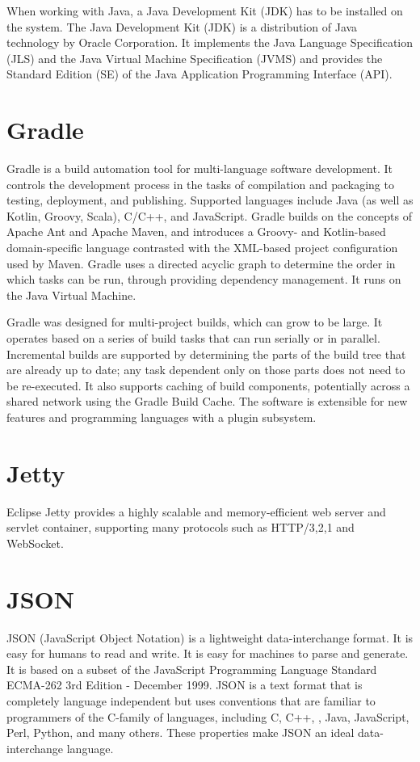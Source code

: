 	When working with Java, a Java Development Kit (JDK) has to be installed on the system.
	The Java Development Kit (JDK) is a distribution of Java technology by Oracle Corporation. 
	It implements the Java Language Specification (JLS) and the Java Virtual Machine Specification (JVMS) 
	and provides the Standard Edition (SE) of the Java Application Programming Interface (API). 

\section{Gradle}
	Gradle \cite{gradle} is a build automation tool for multi-language software development. It controls the development process in the tasks of compilation 
	and packaging to testing, deployment, and publishing. Supported languages include Java (as well as Kotlin, Groovy, Scala), C/C++, and JavaScript.
	Gradle builds on the concepts of Apache Ant and Apache Maven, and introduces a Groovy- and Kotlin-based domain-specific language contrasted with 
	the XML-based project configuration used by Maven. Gradle uses a directed acyclic graph to determine the order in which tasks can be run, 
	through providing dependency management. It runs on the Java Virtual Machine.

	Gradle was designed for multi-project builds, which can grow to be large. It operates based on a series of build tasks that can run serially or in parallel.
	Incremental builds are supported by determining the parts of the build tree that are already up to date; any task dependent only on those parts does not need 
	to be re-executed. It also supports caching of build components, potentially across a shared network using the Gradle Build Cache. 
	The software is extensible for new features and programming languages with a plugin subsystem. 

\section{Jetty}
	Eclipse Jetty \cite{jetty} provides a highly scalable and memory-efficient web server and servlet container, supporting many protocols
	 such as HTTP/3,2,1 and WebSocket.

\section{JSON}
	JSON (JavaScript Object Notation) \cite{json} is a lightweight data-interchange format. It is easy for humans to read and write. 
	It is easy for machines to parse and generate. It is based on a subset of the JavaScript Programming Language Standard ECMA-262 3rd Edition - December 1999.
	JSON is a text format that is completely language independent but uses conventions 
	that are familiar to programmers of the C-family of languages, including C, C++, , Java, JavaScript, Perl, Python, and many others. These properties make JSON an ideal data-interchange language.

